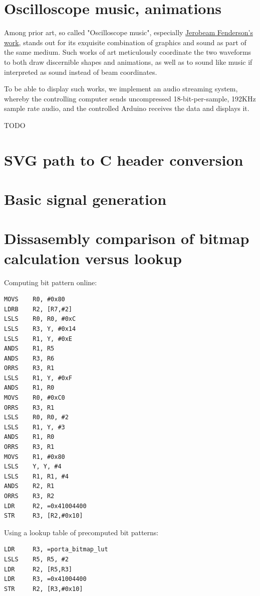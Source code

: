 \documentclass[12pt]{article}
\begin{document}
\section{Oscilloscope music, animations}

Among prior art, so called "Oscilloscope music", especially \href{https://www.youtube.com/playlist?list=PLFgoUhNvMLrr8izq38HX6rjFR-nkfklxw}{Jerobeam Fenderson's work}, stands out for its exquisite combination of graphics and sound as part of the same medium. Such works of art meticulously coordinate the two waveforms to both draw discernible shapes and animations, as well as to sound like music if interpreted as sound instead of beam coordinates.

To be able to display such works, we implement an audio streaming system, whereby the controlling computer sends uncompressed 18-bit-per-sample, 192KHz sample rate audio, and the controlled Arduino receives the data and displays it.

TODO

\newpage
\begin{appendices}
\section{SVG path to C header conversion}
\label{appendix:svg2header}


\newpage
\section{Basic signal generation}
\label{appendix:staticvector}


\newpage
\section{Dissasembly comparison of bitmap calculation versus lookup}
\label{appendix:lutoptimisation}

\begin{multicols}{2}

\noindent Computing bit pattern online:
\begin{lstlisting}
MOVS    R0, #0x80
LDRB    R2, [R7,#2]
LSLS    R0, R0, #0xC
LSLS    R3, Y, #0x14
LSLS    R1, Y, #0xE
ANDS    R1, R5
ANDS    R3, R6
ORRS    R3, R1
LSLS    R1, Y, #0xF
ANDS    R1, R0
MOVS    R0, #0xC0
ORRS    R3, R1
LSLS    R0, R0, #2
LSLS    R1, Y, #3
ANDS    R1, R0
ORRS    R3, R1
MOVS    R1, #0x80
LSLS    Y, Y, #4
LSLS    R1, R1, #4
ANDS    R2, R1
ORRS    R3, R2
LDR     R2, =0x41004400
STR     R3, [R2,#0x10]
\end{lstlisting}

\columnbreak
\noindent Using a lookup table of precomputed bit patterns:

\begin{lstlisting}
LDR     R3, =porta_bitmap_lut
LSLS    R5, R5, #2
LDR     R2, [R5,R3]
LDR     R3, =0x41004400
STR     R2, [R3,#0x10]
\end{lstlisting}

\end{multicols}

\end{appendices}
\end{document}
